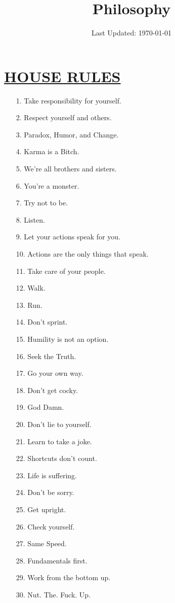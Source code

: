 \documentclass[11pt]{article}
\title{	
	\normalfont \normalsize 
	\huge Philosophy
}
\date{Last Updated: \normalsize\today}
\begin{document}
\maketitle
\section*{\ul{HOUSE RULES}}
\begin{enumerate}
	
	\item[1.] Take responsibility for yourself.
	\item[2.] Respect yourself and others.
	\item[3.] Paradox, Humor, and Change.
	\item[4.] Karma is a Bitch.
	\item[5.] We're all brothers and sisters.
	\item[6.] You're a monster.
	\item[7.] Try not to be.
	\item[8.] Listen.
	\item[9.] Let your actions speak for you.
	\item[10.] Actions are the only things that speak.
	\item[11.] Take care of your people.
	\item[12.] Walk.
	\item[13.] Run.
	\item[14.] Don't sprint.
	\item[15.] Humility is not an option.
	\item[16.] Seek the Truth.
	\item[17.] Go your own way.
	\item[18.] Don't get cocky.
	\item[19.] God Damn.
	\item[20.] Don't lie to yourself.
	\item[21.] Learn to take a joke.
	\item[22.] Shortcuts don't count.
	\item[23.] Life is suffering.
	\item[24.] Don't be sorry.
	\item[25.] Get upright.
	\item[26.] Check yourself.
	\item[27.] Same Speed.
	\item[28.] Fundamentals first.
	\item[29.] Work from the bottom up.
	\item[30.] Nut. The. Fuck. Up.

\end{enumerate}
\end{document}
